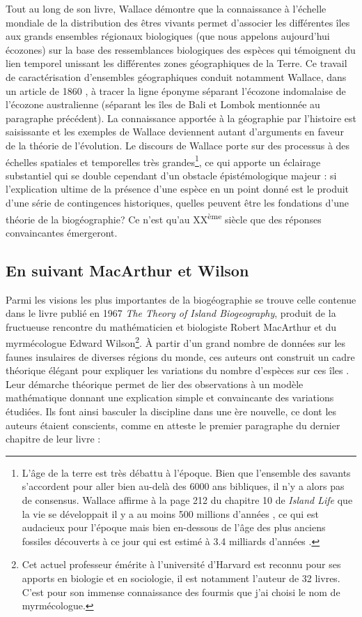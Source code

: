 Tout au long de son livre, Wallace démontre que la connaissance à
l'échelle mondiale de la distribution des êtres vivants permet
d'associer les différentes îles aux grands ensembles régionaux
biologiques (que nous appelons aujourd'hui écozones) sur la base des
ressemblances biologiques des espèces qui témoignent du lien temporel
unissant les différentes zones géographiques de la Terre. Ce travail de
caractérisation d'ensembles géographiques conduit notamment Wallace,
dans un article de 1860 \citep{Wallace1860}, à tracer la ligne éponyme
séparant l'écozone indomalaise de l'écozone australienne (séparant les
îles de Bali et Lombok mentionnée au paragraphe précédent). La
connaissance apportée à la géographie par l'histoire est saisissante et
les exemples de Wallace deviennent autant d'arguments en faveur de la
théorie de l'évolution. Le discours de Wallace porte sur des processus à
des échelles spatiales et temporelles très grandes\footnote{L'âge de la
  terre est très débattu à l'époque. Bien que l'ensemble des savants
  s'accordent pour aller bien au-delà des 6000 ans bibliques, il n'y a
  alors pas de consensus. Wallace affirme à la page 212 du chapitre 10
  de \emph{Island Life} que la vie se développait il y a au moins 500
  millions d'années \citep{wallace1881island}, ce qui est audacieux pour
  l'époque mais bien en-dessous de l'âge des plus anciens fossiles
  découverts à ce jour qui est estimé à 3.4 milliards d'années
  \citep{Wacey2011}.}, ce qui apporte un éclairage substantiel qui se
double cependant d'un obstacle épistémologique majeur : si l'explication
ultime de la présence d'une espèce en un point donné est le produit
d'une série de contingences historiques, quelles peuvent être les
fondations d'une théorie de la biogéographie? Ce n'est qu'au
XX\textsuperscript{ème} siècle que des réponses convaincantes
émergeront.

\subsection*{En suivant MacArthur et
Wilson}\label{en-suivant-macarthur-et-wilson}

Parmi les visions les plus importantes de la biogéographie se trouve
celle contenue dans le livre publié en 1967 \emph{The Theory of Island
Biogeography}, produit de la fructueuse rencontre du mathématicien et
biologiste Robert MacArthur et du myrmécologue Edward Wilson\footnote{Cet
  actuel professeur émérite à l'université d'Harvard est reconnu pour
  ses apports en biologie et en sociologie, il est notamment l'auteur de
  32 livres. C'est pour son immense connaissance des fourmis que j'ai
  choisi le nom de myrmécologue.}. À partir d'un grand nombre de données
sur les faunes insulaires de diverses régions du monde, ces auteurs ont
construit un cadre théorique élégant pour expliquer les variations du
nombre d'espèces sur ces îles \citep{MacArthur1967}. Leur démarche
théorique permet de lier des observations à un modèle mathématique
donnant une explication simple et convaincante des variations étudiées.
Ils font ainsi basculer la discipline dans une ère nouvelle, ce dont les
auteurs étaient conscients, comme en atteste le premier paragraphe du
dernier chapitre de leur livre :

